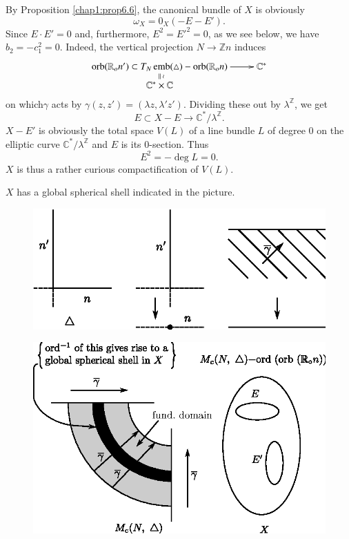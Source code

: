  \noindent
 By Proposition \ref{chap1:prop6.6}, the canonical bundle of $X$ is obviously 
  $$
 \omega_X = 0_X (-E-E').
 $$
  Since $E \cdot E' = 0$ and, furthermore, $E^2 = E'^2 = 0$, as we see below,
 we have $b_2 = -c_1^2 = 0 $. Indeed, the vertical  projection $N \to
 \mathbb{Z}n$ induces 
\[
\xymatrix@R=0.2cm{
\orb (\mathbb{R}_o n') \subset T_N \emb (\triangle) - \orb
(\mathbb{R}_o n) \ar[r] \ar@{}[d]^\wr|{||} & \mathbb{C}^*  \\
\mathbb{C}^* \times \mathbb{C} &  
}
\]
on which\pageoriginale $\gamma$ acts by $\gamma (z, z') = (\lambda z,
\lambda' z')$. Dividing these out by $\lambda^{\mathbb{Z}}$, we get  
$$
E \subset X - E \longrightarrow \mathbb{C}^*  / \lambda^{\mathbb{Z}}. 
$$
$X-E'$ is obviously the total space $V(L)$ of a line bundle $L$ of
degree 0 on the elliptic curve $\mathbb{C}^*/  \lambda^{\mathbb{Z}}$
and $E$ is its 0-section. Thus 
$$
E^2 = -\deg L = 0 .
$$
$X$ is thus a rather curious compactification of $V(L)$.


$X$ has a global spherical shell indicated in the picture.
 \begin{figure}[H]
\centering 
\includegraphics{vol58-fig/fig58-67.eps} 
\end{figure}
 \begin{figure}[H]
\centering 
\includegraphics{vol58-fig/fig58-68.eps} 
\end{figure}

